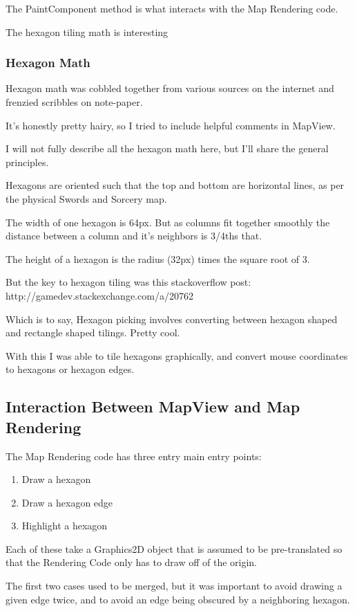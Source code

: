 \documentclass[12pt,a4paper]{article}
\begin{document}
The PaintComponent method is what interacts with the Map Rendering code.

The hexagon tiling math is interesting

\subsubsection{Hexagon Math}
Hexagon math was cobbled together from various sources on the internet and
frenzied scribbles on note-paper. 

It's honestly pretty hairy, so I tried to include helpful comments in
MapView.

I will not fully describe all the hexagon math here, but I'll share the general
principles.

Hexagons are oriented such that the top and bottom are horizontal lines,
as per the physical Swords and Sorcery map.

The width of one hexagon is 64px. But as columns fit together
smoothly the distance between a column and it's neighbors is 3/4ths that.

The height of a hexagon is the radius (32px) times the square root of 3.

But the key to hexagon tiling was this stackoverflow post:
http://gamedev.stackexchange.com/a/20762 

Which is to say, Hexagon picking involves converting between hexagon shaped
and rectangle shaped tilings. Pretty cool.

With this I was able to tile hexagons graphically, and convert mouse coordinates
to hexagons or hexagon edges.

\subsection{Interaction Between MapView and Map Rendering}

The Map Rendering code has three entry main entry points:
\begin{enumerate}
\item{Draw a hexagon}
\item{Draw a hexagon edge}
\item{Highlight a hexagon}
\end{enumerate}

Each of these take a Graphics2D object that is assumed to be pre-translated so
that the Rendering Code only has to draw off of the origin.

The first two cases used to be merged, but it was important to avoid drawing a
given edge twice, and to avoid an edge being obscured by a neighboring hexagon.
\end{document}
